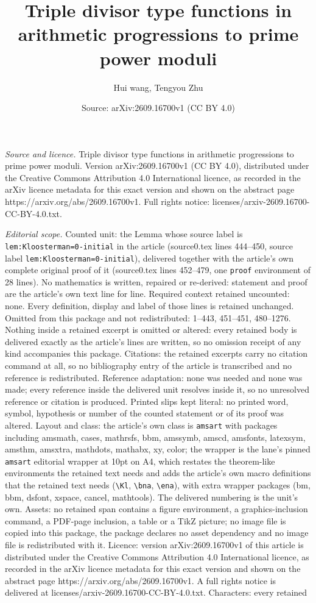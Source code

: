 \documentclass[10pt,a4paper]{amsart}
\title[Triple divisor type functions in arithmetic progressions to ]{Triple divisor type functions in arithmetic progressions to prime power moduli}
\author{Hui wang, Tengyou Zhu}
\date{Source: arXiv:2609.16700v1 (CC BY 4.0)}
\begin{document}
\maketitle

\noindent\emph{Source and licence.} Triple divisor type functions in arithmetic progressions to prime power moduli. Version arXiv:2609.16700v1 (CC BY 4.0), distributed under the Creative Commons Attribution 4.0 International licence, as recorded in the arXiv licence metadata for this exact version and shown on the abstract page https://arxiv.org/abs/2609.16700v1. Full rights notice: licenses/arxiv-2609.16700-CC-BY-4.0.txt.\par\smallskip

\noindent\textit{Editorial scope.} Counted unit: the Lemma whose source label is \texttt{lem:Kloosterman=0-initial} in the article (source0.tex lines 444--450, source label \texttt{lem:Kloosterman=0-initial}), delivered together with the article's own complete original proof of it (source0.tex lines 452--479, one \texttt{proof} environment of 28 lines). No mathematics is written, repaired or re-derived: statement and proof are the article's own text line for line. Required context retained uncounted: none. Every definition, display and label of those lines is retained unchanged. Omitted from this package and not redistributed: 1--443, 451--451, 480--1276. Nothing inside a retained excerpt is omitted or altered: every retained body is delivered exactly as the article's lines are written, so no omission receipt of any kind accompanies this package. Citations: the retained excerpts carry no citation command at all, so no bibliography entry of the article is transcribed and no reference is redistributed. Reference adaptation: none was needed and none was made; every reference inside the delivered unit resolves inside it, so no unresolved reference or citation is produced. Printed slips kept literal: no printed word, symbol, hypothesis or number of the counted statement or of its proof was altered. Layout and class: the article's own class is \texttt{amsart} with packages including amsmath, cases, mathrsfs, bbm, amssymb, amscd, amsfonts, latexsym, amsthm, amsxtra, mathdots, mathabx, xy, color; the wrapper is the lane's pinned \texttt{amsart} editorial wrapper at 10pt on A4, which restates the theorem-like environments the retained text needs and adds the article's own macro definitions that the retained text needs (\texttt{\textbackslash Kl}, \texttt{\textbackslash bna}, \texttt{\textbackslash ena}), with extra wrapper packages (bm, bbm, dsfont, xspace, cancel, mathtools). The delivered numbering is the unit's own. Assets: no retained span contains a figure environment, a graphics-inclusion command, a PDF-page inclusion, a table or a TikZ picture; no image file is copied into this package, the package declares no asset dependency and no image file is redistributed with it. Licence: version arXiv:2609.16700v1 of this article is distributed under the Creative Commons Attribution 4.0 International licence, as recorded in the arXiv licence metadata for this exact version and shown on the abstract page https://arxiv.org/abs/2609.16700v1. A full rights notice is delivered at licenses/arxiv-2609.16700-CC-BY-4.0.txt. Characters: every retained 
\end{document}
